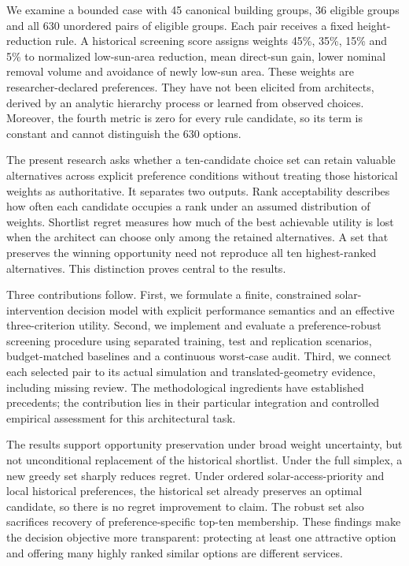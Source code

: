 \documentclass{llncs}
\begin{document}
We examine a bounded case with 45 canonical building groups, 36 eligible groups and all 630 unordered pairs of eligible groups. Each pair receives a fixed height-reduction rule. A historical screening score assigns weights 45\%, 35\%, 15\% and 5\% to normalized low-sun-area reduction, mean direct-sun gain, lower nominal removal volume and avoidance of newly low-sun area. These weights are researcher-declared preferences. They have not been elicited from architects, derived by an analytic hierarchy process or learned from observed choices. Moreover, the fourth metric is zero for every rule candidate, so its term is constant and cannot distinguish the 630 options.

The present research asks whether a ten-candidate choice set can retain valuable alternatives across explicit preference conditions without treating those historical weights as authoritative. It separates two outputs. Rank acceptability describes how often each candidate occupies a rank under an assumed distribution of weights. Shortlist regret measures how much of the best achievable utility is lost when the architect can choose only among the retained alternatives. A set that preserves the winning opportunity need not reproduce all ten highest-ranked alternatives. This distinction proves central to the results.

Three contributions follow. First, we formulate a finite, constrained solar-intervention decision model with explicit performance semantics and an effective three-criterion utility. Second, we implement and evaluate a preference-robust screening procedure using separated training, test and replication scenarios, budget-matched baselines and a continuous worst-case audit. Third, we connect each selected pair to its actual simulation and translated-geometry evidence, including missing review. The methodological ingredients have established precedents; the contribution lies in their particular integration and controlled empirical assessment for this architectural task.

The results support opportunity preservation under broad weight uncertainty, but not unconditional replacement of the historical shortlist. Under the full simplex, a new greedy set sharply reduces regret. Under ordered solar-access-priority and local historical preferences, the historical set already preserves an optimal candidate, so there is no regret improvement to claim. The robust set also sacrifices recovery of preference-specific top-ten membership. These findings make the decision objective more transparent: protecting at least one attractive option and offering many highly ranked similar options are different services.
\end{document}
